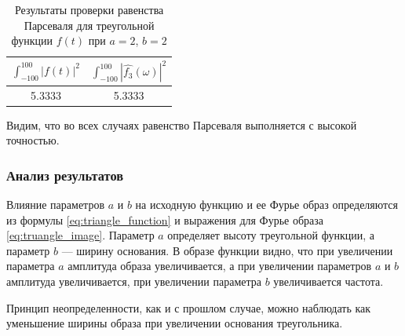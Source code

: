\begin{table}[ht!]
    \centering
    \begin{tabular}{|c|c|}
        \hline
        $\displaystyle\int_{-100}^{100}{|f(t)|^2}$ & $\displaystyle\int_{-100}^{100}{|\hat{f_3}(\omega)|^2}$ \\
        \hline
        5.3333 & 5.3333 \\
        \hline
    \end{tabular}
    \caption{Результаты проверки равенства Парсеваля для треугольной функции $f(t)$ при $a = 2$, $b = 2$}
    \label{tab:triangle_3_parseval_check}
\end{table}

Видим, что во всех случаях равенство Парсеваля выполняется с высокой точностью.

\subsubsection{Анализ результатов}
Влияние параметров $a$ и $b$ на исходную функцию и ее Фурье образ определяются из формулы \eqref{eq:triangle_function} и выражения для Фурье образа \eqref{eq:truangle_image}. Параметр $a$ определяет высоту треугольной функции, а параметр $b$ --- ширину основания. В образе функции видно, что при увеличении параметра $a$ амплитуда образа увеличивается, а при увеличении параметров $a$ и $b$ амплитуда увеличивается, при увеличении параметра $b$ увеличивается частота. 

Принцип неопределенности, как и с прошлом случае, можно наблюдать как уменьшение ширины образа при увеличении основания треугольника.